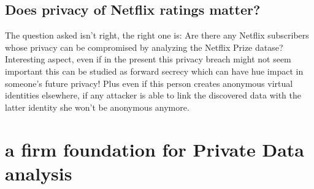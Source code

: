 \documentclass[10pt,a4paper]{report}
\begin{document}
\section{Does privacy of Netflix ratings matter?}
The question asked isn't right, the right one is: Are there any Netflix subscribers whose privacy can be compromised by analyzing the Netflix Prize datase?\\
Interesting aspect, even if in the present this privacy breach might not seem important this can be studied as forward secrecy which can have hue impact in someone's future privacy! Plus even if this person creates anonymous virtual identities elsewhere, if any attacker is able to link the discovered data with the latter identity she won't be anonymous anymore.
\chapter{a firm foundation for Private Data analysis}
\end{document}
